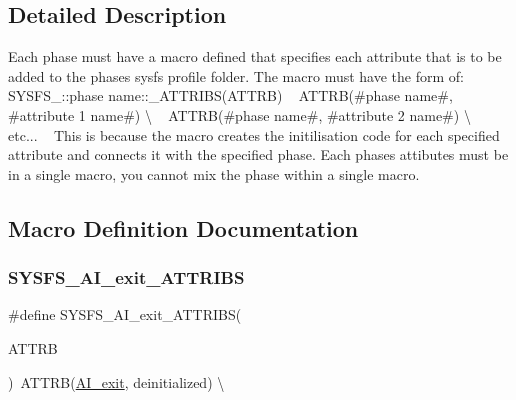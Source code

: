 \subsection{Detailed Description}
Each phase must have a macro defined that specifies each attribute that is to be added to the phase\textquotesingle{}s sysfs profile folder. The macro must have the form of\+: ~\newline
 S\+Y\+S\+F\+S\+\_\+\+::phase name\+::\+\_\+\+A\+T\+T\+R\+I\+B\+S(\+A\+T\+T\+R\+B) ~\newline
 A\+T\+T\+RB(\#phase name\#, \#attribute 1 name\#) \textbackslash{} ~\newline
 A\+T\+T\+RB(\#phase name\#, \#attribute 2 name\#) \textbackslash{} ~\newline
 etc... ~\newline
 This is because the macro creates the initilisation code for each specified attribute and connects it with the specified phase. Each phase\textquotesingle{}s attibutes must be in a single macro, you cannot mix the phase within a single macro. 

\subsection{Macro Definition Documentation}
\mbox{\label{group__sysfs__attrb__init_ga4d9477c773ba5f22fe2355ed48ab5276}} 
\subsubsection{\texorpdfstring{S\+Y\+S\+F\+S\+\_\+\+A\+I\+\_\+exit\+\_\+\+A\+T\+T\+R\+I\+BS}{SYSFS\_AI\_exit\_ATTRIBS}}
{\footnotesize\ttfamily \#define S\+Y\+S\+F\+S\+\_\+\+A\+I\+\_\+exit\+\_\+\+A\+T\+T\+R\+I\+BS(\begin{DoxyParamCaption}\item[{}]{A\+T\+T\+RB }\end{DoxyParamCaption})~A\+T\+T\+RB(\hyperlink{AI__gov__phases_8h_a59664fef4d2987410ea13b917756d6aca35e180df2c6d0504f1d2ca890d0e4444}{A\+I\+\_\+exit}, deinitialized) \textbackslash{}}



